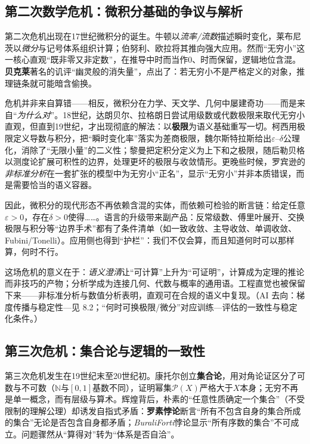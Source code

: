 \subsection{第二次数学危机：微积分基础的争议与解析}
第二次危机出现在17世纪微积分的诞生。牛顿以{\itshape 流率/流数}描述瞬时变化，莱布尼茨以{\itshape 微分}与记号体系组织计算；伯努利、欧拉将其推向强大应用。然而“无穷小”这一核心直观“既非零又非定数”，在推导中时而当作$0$、时而保留，逻辑地位含混。{\bf 贝克莱}著名的讥评“幽灵般的消失量”，点出了：若无穷小不是严格定义的对象，推理链条就可能暗含偷换。

危机并非来自算错——相反，微积分在力学、天文学、几何中屡建奇功——而是来自“{\itshape 为什么对}”。18世纪，达朗贝尔、拉格朗日尝试用级数或代数极限来取代无穷小直观，但直到19世纪，才出现彻底的解法：以{\bf 极限}为语义基础重写一切。柯西用极限定义导数与积分，把“瞬时变化率”落实为差商极限，魏尔斯特拉斯给出$\varepsilon$–$\delta$公理化，消除了“无限小量”的二义性；黎曼把定积分定义为上下和之极限，随后勒贝格以测度论扩展可积性的边界，处理更坏的极限与收敛情形。更晚些时候，罗宾逊的{\itshape 非标准分析}在一套扩张的模型中为无穷小“正名”，显示“无穷小”并非本质错误，而是需要恰当的语义容器。

因此，微积分的现代形态不再依赖含混的实体，而依赖可检验的断言链：给定任意$\varepsilon>0$，存在$\delta>0$使得……。语言的升级带来副产品：反常级数、傅里叶展开、交换极限与积分等“边界手术”都有了条件清单（如一致收敛、主导收敛、单调收敛、Fubini/Tonelli）。应用侧也得到“护栏”：我们不仅会算，而且知道何时可以那样算，何时不行。

这场危机的意义在于：{\itshape 语义澄清}让“可计算”上升为“可证明”，计算成为定理的推论而非技巧的产物；分析学成为连接几何、代数与概率的通用语。工程直觉也被保留下来——非标准分析与数值分析表明，直观可在合规的语义中复现。{（AI 去向：梯度传播与稳定性—见 8.2；“何时可换极限/微分”对应训练—评估的一致性与稳定化条件。）}

\subsection{第三次危机：集合论与逻辑的一致性}
第三次危机发生在19世纪末至20世纪初。康托尔创立{\bf 集合论}，用对角论证区分了可数与不可数（$\mathbb{N}$与$[0,1]$基数不同），证明幂集$\mathcal{P}(X)$严格大于$X$本身；无穷不再是单一概念，而有层级与算术。辉煌背后，朴素的“任意性质确定一个集合”（不受限制的理解公理）却诱发自指式矛盾：{\bf 罗素悖论}断言“所有不包含自身的集合所成的集合”无论是否包含自身都矛盾；{\itshape Burali\textendash Forti}悖论显示“所有序数的集合”不可成立。问题骤然从“算得对”转为“体系是否自洽”。

